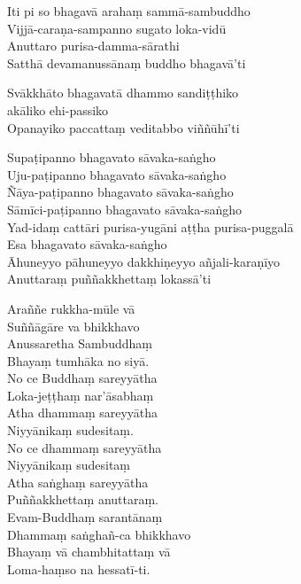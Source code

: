 \begin{paritta}

Iti pi so bhagavā arahaṃ sammā-sambuddho\\
Vijjā-caraṇa-sampanno sugato loka-vidū\\
Anuttaro purisa-damma-sārathi\\
Satthā devamanussānaṃ buddho bhagavā'ti

Svākkhāto bhagavatā dhammo sandiṭṭhiko\\
\vin akāliko ehi-passiko\\
Opanayiko paccattaṃ veditabbo viññūhī'ti

Supaṭipanno bhagavato sāvaka-saṅgho\\
Uju-paṭipanno bhagavato sāvaka-saṅgho\\
Ñāya-paṭipanno bhagavato sāvaka-saṅgho\\
Sāmīci-paṭipanno bhagavato sāvaka-saṅgho\\
Yad-idaṃ cattāri purisa-yugāni aṭṭha purisa-puggalā\\
Esa bhagavato sāvaka-saṅgho\\
Āhuneyyo pāhuneyyo dakkhiṇeyyo añjali-karaṇīyo\\
Anuttaraṃ puññakkhettaṃ lokassā'ti

\sidepar{\pointerMark}%
Araññe rukkha-mūle vā\\
Suññāgāre va bhikkhavo\\
Anussaretha Sambuddhaṃ\\
Bhayaṃ tumhāka no siyā.\\
No ce Buddhaṃ sareyyātha\\
Loka-jeṭṭhaṃ nar'āsabhaṃ\\
Atha dhammaṃ sareyyātha\\
Niyyānikaṃ sudesitaṃ.\\
No ce dhammaṃ sareyyātha\\
Niyyānikaṃ sudesitaṃ\\
Atha saṅghaṃ sareyyātha\\
Puññakkhettaṃ anuttaraṃ.\\
Evam-Buddhaṃ sarantānaṃ\\
Dhammaṃ saṅghañ-ca bhikkhavo\\
Bhayaṃ vā chambhitattaṃ vā\\
Loma-haṃso na hessatī-ti.

\end{paritta}

